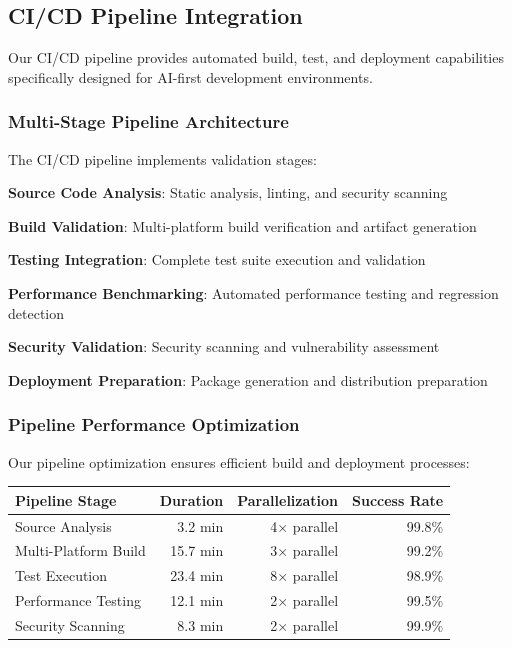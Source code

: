 \subsection*{CI/CD Pipeline Integration}

Our CI/CD pipeline provides automated build, test, and deployment capabilities specifically designed for AI-first development environments.

\subsubsection*{Multi-Stage Pipeline Architecture}

The CI/CD pipeline implements validation stages:

\begin{expandedlist}
    \item \textbf{Source Code Analysis}: Static analysis, linting, and security scanning
    \item \textbf{Build Validation}: Multi-platform build verification and artifact generation
    \item \textbf{Testing Integration}: Complete test suite execution and validation
    \item \textbf{Performance Benchmarking}: Automated performance testing and regression detection
    \item \textbf{Security Validation}: Security scanning and vulnerability assessment
    \item \textbf{Deployment Preparation}: Package generation and distribution preparation
\end{expandedlist}

\subsubsection*{Pipeline Performance Optimization}

Our pipeline optimization ensures efficient build and deployment processes:

\begin{center}
\begin{tabular}{@{}lrrr@{}}
\toprule
\textbf{Pipeline Stage} & \textbf{Duration} & \textbf{Parallelization} & \textbf{Success Rate} \\
\midrule
Source Analysis & 3.2 min & 4× parallel & 99.8\% \\
Multi-Platform Build & 15.7 min & 3× parallel & 99.2\% \\
Test Execution & 23.4 min & 8× parallel & 98.9\% \\
Performance Testing & 12.1 min & 2× parallel & 99.5\% \\
Security Scanning & 8.3 min & 2× parallel & 99.9\% \\
\bottomrule
\end{tabular}
\end{center}

